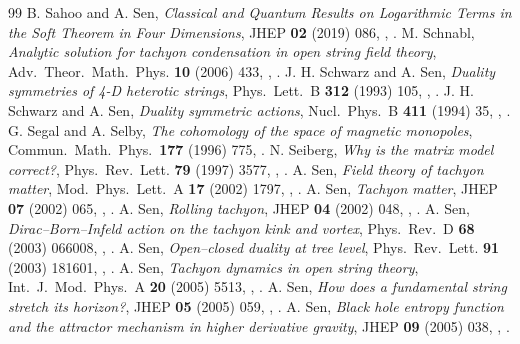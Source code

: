 \begin{thebibliography}{99}
 B. Sahoo and A. Sen, \emph{Classical and Quantum Results on Logarithmic Terms in the Soft Theorem in Four Dimensions}, JHEP \textbf{02} (2019) 086, , .
 M. Schnabl, \emph{Analytic solution for tachyon condensation in open string field theory}, Adv.\ Theor.\ Math.\ Phys. \textbf{10} (2006) 433, , .
 J. H. Schwarz and A. Sen, \emph{Duality symmetries of 4-D heterotic strings}, Phys.\ Lett.\ B \textbf{312} (1993) 105, , .
 J. H. Schwarz and A. Sen, \emph{Duality symmetric actions}, Nucl.\ Phys.\ B \textbf{411} (1994) 35, , .
 G. Segal and A. Selby, \emph{The cohomology of the space of magnetic monopoles}, Commun.\ Math.\ Phys.\ \textbf{177} (1996) 775, .
 N. Seiberg, \emph{Why is the matrix model correct?}, Phys.\ Rev.\ Lett. \textbf{79} (1997) 3577, , .
 A. Sen, \emph{Field theory of tachyon matter}, Mod.\ Phys.\ Lett.\ A \textbf{17} (2002) 1797, , .
 A. Sen, \emph{Tachyon matter}, JHEP \textbf{07} (2002) 065, , .
 A. Sen, \emph{Rolling tachyon}, JHEP \textbf{04} (2002) 048, , .
 A. Sen, \emph{Dirac--Born--Infeld action on the tachyon kink and vortex}, Phys.\ Rev.\ D \textbf{68} (2003) 066008, , .
 A. Sen, \emph{Open--closed duality at tree level}, Phys.\ Rev.\ Lett. \textbf{91} (2003) 181601, , .
 A. Sen, \emph{Tachyon dynamics in open string theory}, Int.\ J.\ Mod.\ Phys.\ A \textbf{20} (2005) 5513, , .
 A. Sen, \emph{How does a fundamental string stretch its horizon?}, JHEP \textbf{05} (2005) 059, , .
 A. Sen, \emph{Black hole entropy function and the attractor mechanism in higher derivative gravity}, JHEP \textbf{09} (2005) 038, , .

\end{thebibliography}
